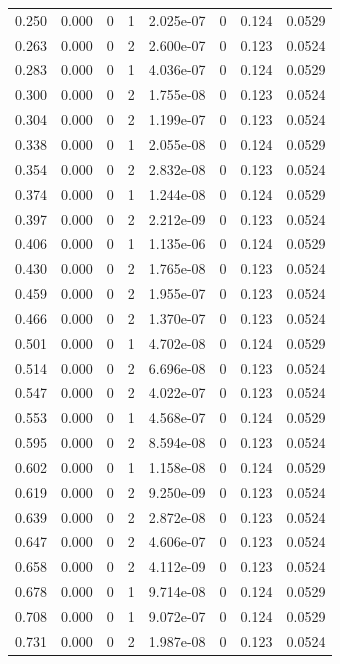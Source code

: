\documentclass[preview]{standalone}
\begin{document}
{{\begin{tabular}{L{1.2cm}C{1.2cm} C{0.3cm}C{0.5cm} C{1.4cm}C{1.4cm} C{1.4cm}C{1.4cm}}
  0.250  &  0.000  & 0     &  1 &  2.025e-07  & 0  & 0.124 &  0.0529   \\ 
  0.263  &  0.000  & 0     &  2 &  2.600e-07  & 0  & 0.123 &  0.0524   \\ 
  0.283  &  0.000  & 0     &  1 &  4.036e-07  & 0  & 0.124 &  0.0529   \\ 
  0.300  &  0.000  & 0     &  2 &  1.755e-08  & 0  & 0.123 &  0.0524   \\ 
  0.304  &  0.000  & 0     &  2 &  1.199e-07  & 0  & 0.123 &  0.0524   \\ 
  0.338  &  0.000  & 0     &  1 &  2.055e-08  & 0  & 0.124 &  0.0529   \\ 
  0.354  &  0.000  & 0     &  2 &  2.832e-08  & 0  & 0.123 &  0.0524   \\ 
  0.374  &  0.000  & 0     &  1 &  1.244e-08  & 0  & 0.124 &  0.0529   \\ 
  0.397  &  0.000  & 0     &  2 &  2.212e-09  & 0  & 0.123 &  0.0524   \\ 
  0.406  &  0.000  & 0     &  1 &  1.135e-06  & 0  & 0.124 &  0.0529   \\ 
  0.430  &  0.000  & 0     &  2 &  1.765e-08  & 0  & 0.123 &  0.0524   \\ 
  0.459  &  0.000  & 0     &  2 &  1.955e-07  & 0  & 0.123 &  0.0524   \\ 
  0.466  &  0.000  & 0     &  2 &  1.370e-07  & 0  & 0.123 &  0.0524   \\ 
  0.501  &  0.000  & 0     &  1 &  4.702e-08  & 0  & 0.124 &  0.0529   \\ 
  0.514  &  0.000  & 0     &  2 &  6.696e-08  & 0  & 0.123 &  0.0524   \\ 
  0.547  &  0.000  & 0     &  2 &  4.022e-07  & 0  & 0.123 &  0.0524   \\ 
  0.553  &  0.000  & 0     &  1 &  4.568e-07  & 0  & 0.124 &  0.0529   \\ 
  0.595  &  0.000  & 0     &  2 &  8.594e-08  & 0  & 0.123 &  0.0524   \\ 
  0.602  &  0.000  & 0     &  1 &  1.158e-08  & 0  & 0.124 &  0.0529   \\ 
  0.619  &  0.000  & 0     &  2 &  9.250e-09  & 0  & 0.123 &  0.0524   \\ 
  0.639  &  0.000  & 0     &  2 &  2.872e-08  & 0  & 0.123 &  0.0524   \\ 
  0.647  &  0.000  & 0     &  2 &  4.606e-07  & 0  & 0.123 &  0.0524   \\ 
  0.658  &  0.000  & 0     &  2 &  4.112e-09  & 0  & 0.123 &  0.0524   \\ 
  0.678  &  0.000  & 0     &  1 &  9.714e-08  & 0  & 0.124 &  0.0529   \\ 
  0.708  &  0.000  & 0     &  1 &  9.072e-07  & 0  & 0.124 &  0.0529   \\ 
  0.731  &  0.000  & 0     &  2 &  1.987e-08  & 0  & 0.123 &  0.0524   \\ 
\hline 
\end{tabular} 

}}
\end{document}
